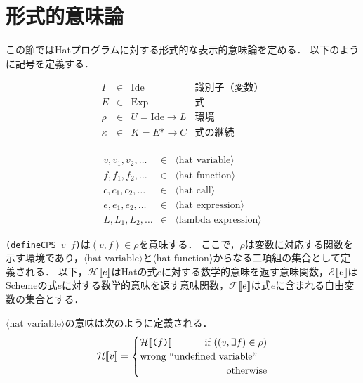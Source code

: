 \documentclass[twocolumn]{jarticle}
\newcommand{\NT}[1]{\ensuremath{\langle\mbox{#1}\rangle}\allowbreak}
\newcommand{\dlrBrack}[1]{\ensuremath{[\![#1]\allowbreak\!]}}
\newcommand{\C}[1]{\mbox{\tt#1}}
\newcommand{\sS}[1]{\ensuremath{\mathcal{E}}\dlrBrack{\mbox{\tt#1}}}
\newcommand{\sH}[1]{\ensuremath{\mathcal{H}}\dlrBrack{\mbox{\tt#1}}}
\newcommand{\FV}[1]{\ensuremath{\mathcal{F}}\dlrBrack{\C{#1}}}
\begin{document}
\section{形式的意味論}

この節ではHatプログラムに対する形式的な表示的意味論を定める．
以下のように記号を定義する．

\[\begin{array}{rcll}
I      &\in& \mbox{Ide}           & \mbox{識別子（変数）}\\
E      &\in& \mbox{Exp}           & \mbox{式} \\
\rho   &\in& U = \mbox{Ide} \to L & 環境  \\
\kappa &\in& K = E* \to C         & 式の継続 \\
\end{array}\]

\begin{eqnarray*}
v, v_1, v_2,\ldots &\in& \NT{hat variable} \\
f, f_1, f_2,\ldots &\in& \NT{hat function} \\
c, c_1, c_2,\ldots &\in& \NT{hat call} \\
e, e_1, e_2,\ldots &\in& \NT{hat expression} \\
L, L_1, L_2,\ldots &\in& \NT{lambda expression}
\end{eqnarray*}

\C{(defineCPS $v$ $f$)}は$(v, f)\in\rho$を意味する．
ここで，$\rho$は変数に対応する関数を示す環境であり，\NT{hat variable}と\NT{hat function}からなる二項組の集合として定義される．
以下，\sH{$e$}はHatの式$e$に対する数学的意味を返す意味関数，\sS{$e$}はSchemeの式$e$に対する数学的意味を返す意味関数，\FV{$e$}は式$e$に含まれる自由変数の集合とする．

\NT{hat variable}の意味は次のように定義される．
\begin{eqnarray}
  \sH{$v$}=
  \begin{cases}
  \sH{($f$)} & \llap{if $((v,\exists f)\in\rho)$} \\
  \mbox{wrong ``undefined variable''} \\
  & \llap{otherwise}
  \end{cases}
\end{eqnarray}
\end{document}
